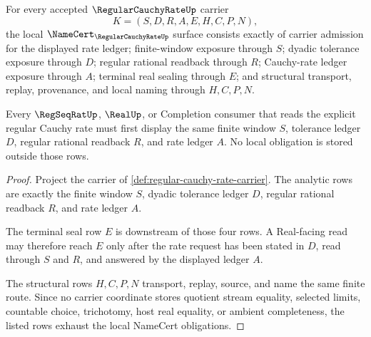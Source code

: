 \begin{theorem}
\label{thm:regular-cauchy-rate-namecert-obligations}
For every accepted $\RegularCauchyRateUp$ carrier
$$
K=(S,D,R,A,E,H,C,P,N),
$$
the local $\NameCert_{\RegularCauchyRateUp}$ surface consists exactly of carrier admission for the displayed rate ledger; finite-window exposure through $S$; dyadic tolerance exposure through $D$; regular rational readback through $R$; Cauchy-rate ledger exposure through $A$; terminal real sealing through $E$; and structural transport, replay, provenance, and local naming through $H,C,P,N$.

Every $\RegSeqRatUp$, $\RealUp$, or Completion consumer that reads the explicit regular Cauchy rate must first display the same finite window $S$, tolerance ledger $D$, regular rational readback $R$, and rate ledger $A$. No local obligation is stored outside those rows.
\end{theorem}
\begin{proof}
Project the carrier of \autoref{def:regular-cauchy-rate-carrier}. The analytic rows are exactly the finite window $S$, dyadic tolerance ledger $D$, regular rational readback $R$, and rate ledger $A$.

The terminal seal row $E$ is downstream of those four rows. A Real-facing read may therefore reach $E$ only after the rate request has been stated in $D$, read through $S$ and $R$, and answered by the displayed ledger $A$.

The structural rows $H,C,P,N$ transport, replay, source, and name the same finite route. Since no carrier coordinate stores quotient stream equality, selected limits, countable choice, trichotomy, host real equality, or ambient completeness, the listed rows exhaust the local NameCert obligations.
\end{proof}

